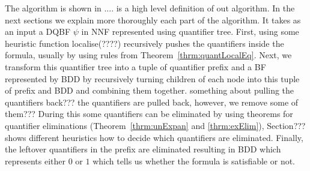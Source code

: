 \documentclass[
  digital, %
  twoside, %
  table,   %
  nolof,     %
  nolot,     %
]{fithesis3}
\theoremstyle{definition}
\theoremstyle{remark}
\begin{document}
The algorithm is shown in .... is a high level definition of out algorithm. In the next sections we explain more thoroughly each part of the algorithm. It takes as an input a DQBF $\psi$ in NNF represented using quantifier tree. First, using some heuristic function localise(????) recursively pushes the quantifiers inside the formula, usually by using rules from Theorem~\ref{thrm:quantLocalEq}. Next, we transform this quantifier tree into a tuple of quantifier prefix and a BF represented by BDD by recursively turning children of each node into this tuple of prefix and BDD and combining them together. something about pulling the quantifiers back??? the quantifiers are pulled back, however, we remove some of them??? During this some quantifiers can be eliminated by using theorems for quantifier eliminations (Theorem~\ref{thrm:unExpan} and \ref{thrm:exElim}), Section??? shows different heuristics how to decide which quantifiers are eliminated. Finally, the leftover quantifiers in the prefix are eliminated resulting in BDD which represents either $0$ or $1$ which tells us whether the formula is satisfiable or not.


\end{document}
